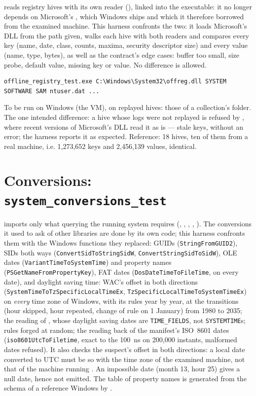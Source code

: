 \documentclass[11pt,a4paper,oneside]{report}
\begin{document}
\wac{} reads registry hives with its own reader
(), linked into the executable: it no longer
depends on Microsoft's , which Windows ships and which it
therefore borrowed from the examined machine. This harness confronts the two:
it loads Microsoft's DLL from the path given, walks each hive with both readers
and compares every key (name, date, class, counts, maxima, security descriptor
size) and every value (name, type, bytes), as well as the contract's edge
cases: buffer too small, size probe, default value, missing key or value. No
difference is allowed.

\begin{lstlisting}
offline_registry_test.exe C:\Windows\System32\offreg.dll SYSTEM SOFTWARE SAM ntuser.dat ...
\end{lstlisting}

To be run on Windows (the VM), on replayed hives: those of a collection's
 folder. The one intended difference: a hive whose logs were
not replayed is refused by \wac{}, where recent versions of Microsoft's DLL
read it as is — stale keys, without an error; the harness reports it as
expected. Reference: 18 hives, ten of them from a real machine, i.e. 1,273,652
keys and 2,456,139 values, identical.

\section{Conversions: \texttt{system\_conversions\_test}}

\wac{} imports only what querying the running system requires
(, , , ,
). The conversions it used to ask of other libraries are
done by its own code; this harness confronts them with the Windows functions
they replaced: GUIDs (\texttt{StringFromGUID2}), SIDs both ways
(\texttt{ConvertSidToStringSidW}, \texttt{ConvertStringSidToSidW}), OLE dates
(\texttt{VariantTimeToSystemTime}) and property names
(\texttt{PSGetNameFromPropertyKey}), FAT dates (\texttt{DosDateTimeToFileTime},
on every date), and daylight saving time: WAC's offset in both directions
(\texttt{SystemTimeToTzSpecificLocalTimeEx}, \texttt{TzSpecificLocalTimeToSystemTimeEx})
on \emph{every} time zone of Windows, with its rules year by year, at the
transitions (hour skipped, hour repeated, change of rule on 1 January) from
1980 to 2035; the reading of , whose daylight saving dates are \texttt{TIME\_FIELDS},
not \texttt{SYSTEMTIME}s; rules forged at random; the reading back of the
manifest's ISO~8601 dates (\texttt{iso8601UtcToFiletime}, exact to the 100~ns on
200,000 instants, malformed dates refused). It also checks the
suspect's offset in both directions: a local
date converted to UTC must be so with the time zone of the examined machine,
not that of the machine running \wac{}. An impossible date (month 13, hour 25)
gives a null date, hence not emitted. The table of property names is generated
from the schema of a reference Windows by .
\end{document}
